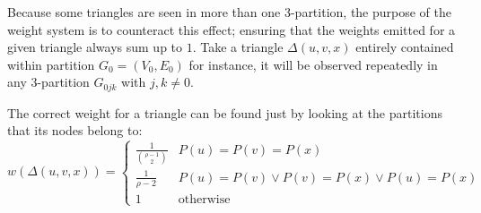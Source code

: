 \documentclass[paper=a4, fontsize=11pt]{scrartcl}
\numberwithin{equation}{section}
\numberwithin{figure}{section}
\numberwithin{table}{section}
\begin{document}
Because some triangles are seen in more than one 3-partition, the purpose of the
weight system is to counteract this effect; ensuring that the weights emitted
for a given triangle always sum up to $1$. Take a triangle $\Delta(u, v, x)$
entirely contained within partition $G_0=(V_0, E_0)$ for instance, it will be
observed repeatedly in any 3-partition $G_{0jk}$ with $j,k\neq 0$.

The correct weight for a triangle can be found just by looking at the partitions
that its nodes belong to:
\[
    w(\Delta(u,v,x)) = \begin{cases}
        \frac{1}{\binom{\rho-1}{2}} & P(u) = P(v) = P(x)  \\
        \frac{1}{\rho-2} & P(u) = P(v) \vee P(v) = P(x) \vee P(u) = P(x) \\
        1 & \text{otherwise}
    \end{cases}
\]
\end{document}
